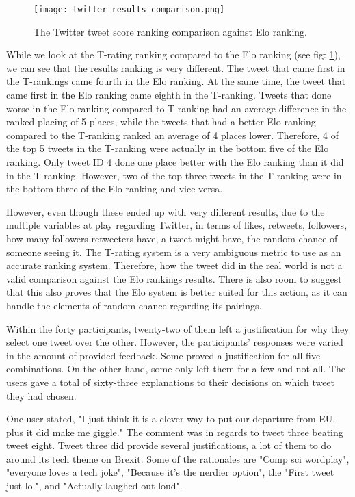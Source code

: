 	\begin{figure}[t]
		\centering
		\texttt{[image: twitter\_results\_comparison.png]}
		\caption{The Twitter tweet score ranking comparison against Elo ranking.}
		\label{fig:twitter_results_comparison}
		
	\end{figure}

	While we look at the T-rating ranking compared to the Elo ranking (see fig: \ref{fig:twitter_results_comparison}), we can see that the results ranking is very different. The tweet that came first in the T-rankings came fourth in the Elo ranking. At the same time, the tweet that came first in the Elo ranking came eighth in the T-ranking.  Tweets that done worse in the Elo ranking compared to T-ranking had an average difference in the ranked placing of 5 places, while the tweets that had a better Elo ranking compared to the T-ranking ranked an average of 4 places lower. Therefore, 4 of the top 5 tweets in the T-ranking were actually in the bottom five of the Elo ranking. Only tweet ID 4 done one place better with the Elo ranking than it did in the T-ranking. However, two of the top three tweets in the T-ranking were in the bottom three of the Elo ranking and vice versa.
	
	However, even though these ended up with very different results, due to the multiple variables at play regarding Twitter, in terms of likes, retweets, followers, how many followers retweeters have, a tweet might have, the random chance of someone seeing it. The T-rating system is a very ambiguous metric to use as an accurate ranking system. Therefore, how the tweet did in the real world is not a valid comparison against the Elo rankings results. There is also room to suggest that this also proves that the Elo system is better suited for this action, as it can handle the elements of random chance regarding its pairings.

	Within the forty participants, twenty-two of them left a justification for why they select one tweet over the other. However, the participants' responses were varied in the amount of provided feedback. Some proved a justification for all five combinations. On the other hand, some only left them for a few and not all. The users gave a total of sixty-three explanations to their decisions on which tweet they had chosen.
	
	One user stated, "I just think it is a clever way to put our departure from EU, plus it did make me giggle." The comment was in regards to tweet three beating tweet eight. Tweet three did provide several justifications, a lot of them to do around its tech theme on Brexit. Some of the rationales are "Comp sci wordplay", "everyone loves a tech joke", "Because it's the nerdier option", the "First tweet just lol", and "Actually laughed out loud".
	
